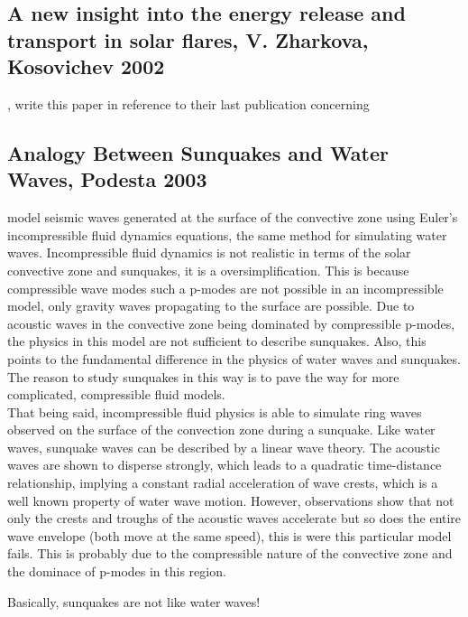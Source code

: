\subsection{A new insight into the energy release and transport in solar flares, V. Zharkova, Kosovichev 2002}
\cite{2002ESASP.477...35Z}, write this paper in reference to their last publication \citep{2001ApJ...550L.105K} concerning

\subsection{Analogy Between Sunquakes and Water Waves, Podesta 2003} 
\cite{2003SoPh..218..227P} model seismic waves generated at the surface of the convective zone using Euler's incompressible fluid dynamics equations, the same method for simulating water waves. Incompressible fluid dynamics is not realistic in terms of the solar convective zone and sunquakes, it is a oversimplification. This is because compressible wave modes such a p-modes are not possible in an incompressible model, only gravity waves propagating to the surface are possible. Due to acoustic waves in the convective zone being dominated by compressible p-modes, the physics in this model are not sufficient to describe sunquakes. Also, this points to the fundamental difference in the physics of water waves and sunquakes. The reason to study sunquakes in this way is to pave the way for more complicated, compressible fluid models.\\
That being said, incompressible fluid physics is able to simulate ring waves observed on the surface of the convection zone during a sunquake. Like water waves, sunquake waves can be described by a linear wave theory. The acoustic waves are shown to disperse strongly, which leads to a quadratic time-distance relationship, implying a constant radial acceleration of wave crests, which is a well known property of water wave motion. However, observations show that not only the crests and troughs of the acoustic waves accelerate but so does the entire wave envelope (both move at the same speed), this is were this particular model fails. This is probably due to the compressible nature of the convective zone and the dominace of p-modes in this region.

Basically, sunquakes are not like water waves!

